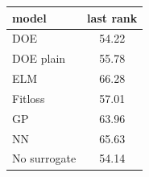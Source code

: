\begin{tabular}{|lc|}
\hline
model & last rank\\
\hline
DOE & 54.22 \\
DOE plain & 55.78 \\
ELM & 66.28 \\
Fitloss & 57.01 \\
GP & 63.96 \\
NN & 65.63 \\
No surrogate & 54.14 \\
\hline
\end{tabular}

